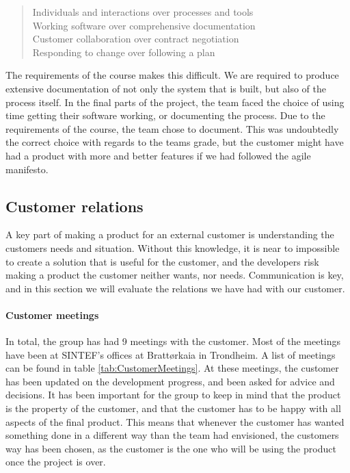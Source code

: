 \documentclass[11pt,a4paper,titlepage,oneside]{report}
\begin{document}
\begin{quote}
Individuals and interactions over processes and tools \\
Working software over comprehensive documentation \\
Customer collaboration over contract negotiation \\
Responding to change over following a plan \cite{AgileManifesto}
\end{quote}

The requirements of the course makes this difficult. We are required to produce extensive documentation of not only the system that is built, but also of the process itself. In the final parts of the project, the team faced the choice of using time getting their software working, or documenting the process. Due to the requirements of the course, the team chose to document. This was undoubtedly the correct choice with regards to the teams grade, but the customer might have had a product with more and better features if we had followed the agile manifesto.

\subsection{Customer relations}
\label{subsec:CustomerRelations}
A key part of making a product for an external customer is understanding the customers needs and situation. Without this knowledge, it is near to impossible to create a solution that is useful for the customer, and the developers risk making a product the customer neither wants, nor needs. Communication is key, and in this section we will evaluate the relations we have had with our customer. 

\paragraph{Customer meetings}
In total, the group has had 9 meetings with the customer. Most of the meetings have been at SINTEF's offices at Brattørkaia in Trondheim. A list of meetings can be found in table \ref{tab:CustomerMeetings}. At these meetings, the customer has been updated on the development progress, and been asked for advice and decisions. It has been important for the group to keep in mind that the product is the property of the customer, and that the customer has to be happy with all aspects of the final product. This means that whenever the customer has wanted something done in a different way than the team had envisioned, the customers way has been chosen, as the customer is the one who will be using the product once the project is over.
\end{document}
